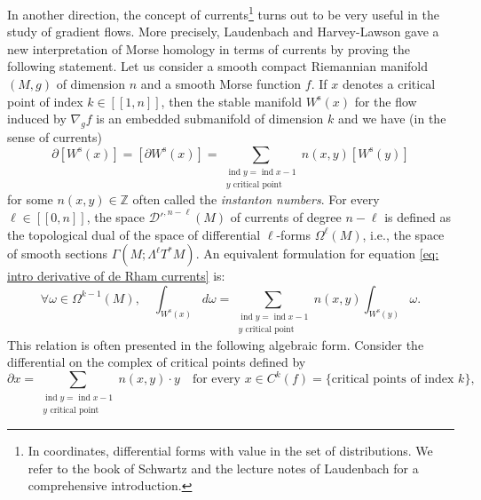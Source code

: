 \documentclass[11pt]{article}
\newcommand{\ie}{i.e.,\xspace}
\newcommand{\lcr}{[\![}
\newcommand{\rcr}{]\!]}
\newcommand{\rs}{\mathrm{s}}
\theoremstyle{definition}
\theoremstyle{plain}
\newcommand{\D}{\mathcal{D}}
\newcommand{\Z}{\mathbb{Z}}
\DeclareMathOperator{\ind}{ind}
\begin{document}
In another direction, the concept of currents\footnote{In coordinates, differential forms with value in the set of distributions. We refer to the book of Schwartz \cite{schwartz} and the lecture notes of Laudenbach \cite{laudenbach-book} for a comprehensive introduction.} turns out to be very useful in the study of gradient flows. More precisely, Laudenbach \cite{laudenbach} and Harvey-Lawson \cite{harvey-lawson} gave a new interpretation of Morse homology in terms of currents by proving the following statement. Let us consider a smooth compact Riemannian manifold $(M,g)$ of dimension $n$ and a smooth Morse function $f$. If $x$ denotes a critical point of index $k\in\lcr1,n\rcr$, then the stable manifold $W^\rs (x)$ for the flow induced by $\nabla_g f$ is an embedded submanifold of dimension $k$ and we have (in the sense of currents)
\begin{equation}\label{eq: intro derivative of de Rham currents}
\partial [W^\rs (x)] = [\partial W^\rs (x)] = \sum_{\substack{\ind y = \ind x - 1 \\ y \text{ critical point}}} n(x,y)[W^\rs (y)]
\end{equation}
for some $n(x,y) \in \Z$ often called the \textit{instanton numbers}. For every $\ell\in\lcr0,n\rcr$, the space $\D'^{,n-\ell} (M)$ of currents of degree $n-\ell$ is defined as the topological dual of the space of differential $\ell$-forms $\Omega^{\ell} (M)$, \ie the space of smooth sections $\Gamma (M; \Lambda^{\ell} T^* M)$. An equivalent formulation for equation \eqref{eq: intro derivative of de Rham currents} is:
\[
\forall \omega \in \Omega^{k-1} (M), \quad \int_{W^\rs(x)} d\omega = \sum_{\substack{\ind y = \ind x - 1 \\ y \text{ critical point}}} n(x,y) \int_{W^\rs (y)} \omega.
\]
This relation is often presented in the following algebraic form. Consider the differential on the complex of critical points defined by
\[
\partial x = \sum_{\substack{\ind y = \ind x - 1 \\y \text{ critical point}}} n(x,y)\cdot y \quad \text{for every }x \in C^k (f) = \{ \text{critical points of index }k \},
\]
\end{document}
